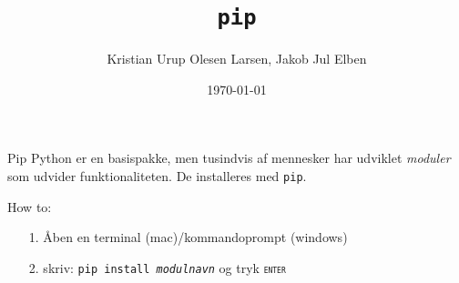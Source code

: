 \documentclass[10pt]{beamer}
\title{\texttt{pip}}
\date{\today}
\author{Kristian Urup Olesen Larsen, Jakob Jul Elben}
\institute{Økonomisk Institut, KU}
\begin{document}
\maketitle

\begin{frame}[fragile]{Pip}
  Python er en basispakke, men tusindvis af mennesker har udviklet \textit{moduler} som udvider funktionaliteten. De installeres med \texttt{pip}.

How to:
\begin{itemize}
  \item[1.] Åben en terminal (mac)/kommandoprompt (windows)
  \item[2.] skriv: \texttt{pip install \textit{modulnavn}} og tryk \texttt{\textsc{enter}}
\end{itemize}

\end{frame}
\end{document}

